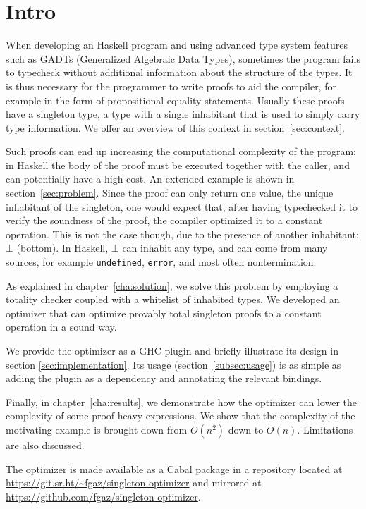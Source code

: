 \chapter{Intro}
\label{cha:intro}

When developing an Haskell program and using advanced type system features such as GADTs (Generalized Algebraic Data Types), sometimes the program fails to typecheck without additional information about the structure of the types.
It is thus necessary for the programmer to write proofs to aid the compiler, for example in the form of propositional equality statements.
Usually these proofs have a singleton type, a type with a single inhabitant that is used to simply carry type information.
We offer an overview of this context in section~\ref{sec:context}.

Such proofs can end up increasing the computational complexity of the program: in Haskell the body of the proof must be executed together with the caller, and can potentially have a high cost.
An extended example is shown in section~\ref{sec:problem}.
Since the proof can only return one value, the unique inhabitant of the singleton, one would expect that, after having typechecked it to verify the soundness of the proof, the compiler optimized it to a constant operation.
This is not the case though, due to the presence of another inhabitant: $\bot$ (bottom).
In Haskell, $\bot$ can inhabit any type, and can come from many sources, for example \texttt{undefined}, \texttt{error}, and most often nontermination.

As explained in chapter~\ref{cha:solution}, we solve this problem by employing a totality checker coupled with a whitelist of inhabited types.
We developed an optimizer that can optimize provably total singleton proofs to a constant operation in a sound way.

We provide the optimizer as a GHC plugin and briefly illustrate its design in section \ref{sec:implementation}.
Its usage (section~\ref{subsec:usage}) is as simple as adding the plugin as a dependency and annotating the relevant bindings.

Finally, in chapter~\ref{cha:results}, we demonstrate how the optimizer can lower the complexity of some proof-heavy expressions.
We show that the complexity of the motivating example is brought down from $O(n^2)$ down to $O(n)$.
Limitations are also discussed.

The optimizer is made available as a Cabal package in a repository located at \url{https://git.sr.ht/~fgaz/singleton-optimizer} and mirrored at \url{https://github.com/fgaz/singleton-optimizer}.

